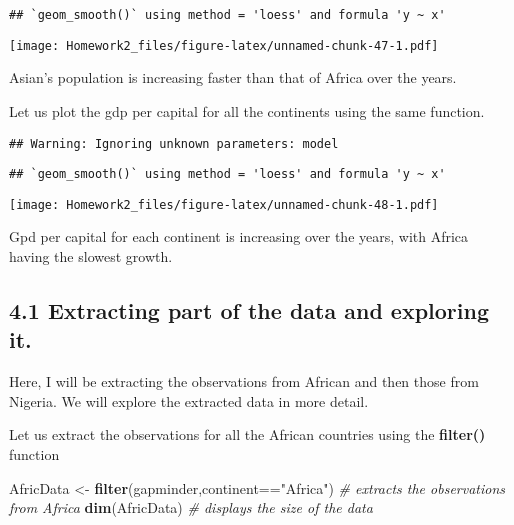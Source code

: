 \documentclass[]{article}
\newenvironment{Shaded}{\begin{snugshade}}{\end{snugshade}}
\newcommand{\KeywordTok}[1]{\textcolor[rgb]{0.13,0.29,0.53}{\textbf{{#1}}}}
\newcommand{\DataTypeTok}[1]{\textcolor[rgb]{0.13,0.29,0.53}{{#1}}}
\newcommand{\StringTok}[1]{\textcolor[rgb]{0.31,0.60,0.02}{{#1}}}
\newcommand{\CommentTok}[1]{\textcolor[rgb]{0.56,0.35,0.01}{\textit{{#1}}}}
\newcommand{\NormalTok}[1]{{#1}}
\begin{document}
\begin{verbatim}
## `geom_smooth()` using method = 'loess' and formula 'y ~ x'
\end{verbatim}

\texttt{[image: Homework2\_files/figure-latex/unnamed-chunk-47-1.pdf]}

Asian's population is increasing faster than that of Africa over the
years.

Let us plot the gdp per capital for all the continents using the same
function.

\begin{Shaded}
\end{Shaded}

\begin{verbatim}
## Warning: Ignoring unknown parameters: model
\end{verbatim}

\begin{verbatim}
## `geom_smooth()` using method = 'loess' and formula 'y ~ x'
\end{verbatim}

\texttt{[image: Homework2\_files/figure-latex/unnamed-chunk-48-1.pdf]}

Gpd per capital for each continent is increasing over the years, with
Africa having the slowest growth.

\subsection{4.1 Extracting part of the data and exploring
it.}\label{extracting-part-of-the-data-and-exploring-it.}

Here, I will be extracting the observations from African and then those
from Nigeria. We will explore the extracted data in more detail.

Let us extract the observations for all the African countries using the
\textbf{filter()} function

\begin{Shaded}
\begin{Highlighting}[]
\NormalTok{AfricData <-}\StringTok{ }\KeywordTok{filter}\NormalTok{(gapminder,continent==}\StringTok{"Africa"}\NormalTok{) }\CommentTok{# extracts the observations from Africa}
\KeywordTok{dim}\NormalTok{(AfricData) }\CommentTok{# displays the size of the data}
\end{Highlighting}
\end{Shaded}
\end{document}
